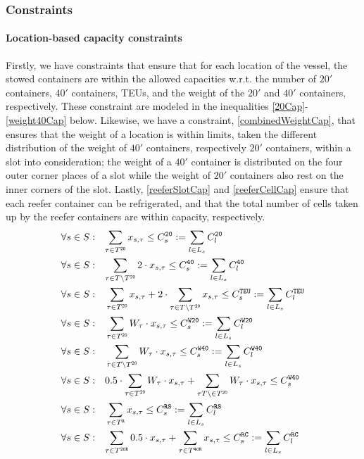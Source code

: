 \subsubsection*{Constraints}
\paragraph{Location-based capacity constraints}
Firstly, we have constraints that ensure that for each location of the vessel, the stowed containers are within the allowed capacities w.r.t. the number of $20'$ containers, $40'$ containers, TEUs, and the weight of the $20'$ and $40'$ containers, respectively. These constraint are modeled in the inequalities \eqref{20Cap}-\eqref{weight40Cap} below.
{Likewise, we have a constraint, \eqref{combinedWeightCap}, that ensures that the weight of a location is within limits, taken the different distribution of the weight of $40'$ containers, respectively $20'$ containers, within a slot into consideration; the weight of a $40'$ container is distributed on the four outer corner places of a slot while the weight of $20'$ containers also rest on the inner corners of the slot.}
Lastly, \eqref{reeferSlotCap} and \eqref{reeferCellCap} ensure that each reefer container can be refrigerated, and that {the total number of cells taken up by the reefer containers are within capacity}, respectively. 
\begin{align}
{\forall s \in S:}&\quad
	\label{20Cap}
	{\sum_{\tau \in T^{\texttt{20}}} x_{s,\tau} \leq C_s^{\texttt{20}} := \sum_{l \in L_s}C_l^{\texttt{20}}}\\
	\label{40Cap}    	
	{\forall s \in S:}&\quad
	{\sum_{\tau \in T\setminus T^{\texttt{20}}} 2\cdot x_{s,\tau} \leq C_s^{\texttt{40}} := \sum_{l \in L_s}C_l^{\texttt{40}}}\\
	\label{teuCap}
	\forall s \in S:&\quad
	\sum_{\tau \in T^{\texttt{20}}} x_{s,\tau} + 2\cdot\sum_{\tau \in T\setminus T^{\texttt{20}}} x_{s,\tau} \leq C_s^{\texttt{TEU}} :=\sum_{l \in L_s}C_l^{\texttt{TEU}}\\
	\label{weight20Cap}
	\forall s \in S:&\quad
	\sum_{\tau \in T^{\texttt{20}}} W_\tau\cdot x_{s,\tau} \leq C_s^{\texttt{W20}} := \sum_{l \in L_s}C_l^{\texttt{W20}}\\
	\label{weight40Cap}
	\forall s \in S:&\quad\sum_{\tau \in T\setminus T^{\texttt{20}}} W_\tau\cdot x_{s,\tau} \leq C_s^{\texttt{W40}} := \sum_{l \in L_s}C_l^{\texttt{W40}}\\
	\label{combinedWeightCap}
	\forall s \in S:&\quad 0.5\cdot \sum_{\tau \in T^{\texttt{20}}} W_\tau\cdot x_{s,\tau} + \sum_{\tau T\setminus \in T^{\texttt{20}}		} W_\tau\cdot x_{s,\tau} \leq C_s^{\texttt{W40}}\\
	\label{reeferSlotCap}
	\forall s \in S:&\quad\sum_{\tau \in T^{\texttt{R}}} x_{s,\tau} \leq C_s^{\texttt{RS}} := \sum_{l \in L_s}C_l^{\texttt{RS}}\\
	\label{reeferCellCap}
	{\forall s \in S:}&\quad
	{\sum_{\tau \in T^{\texttt{20R}}} 0.5\cdot x_{s,\tau} + \sum_{\tau \in T^{\texttt{40R}}} x_{s,\tau} \leq C_s^{\texttt{RC}} :=\sum_{l \in L_s}C_l^{\texttt{RC}}}
\end{align}	 
%

